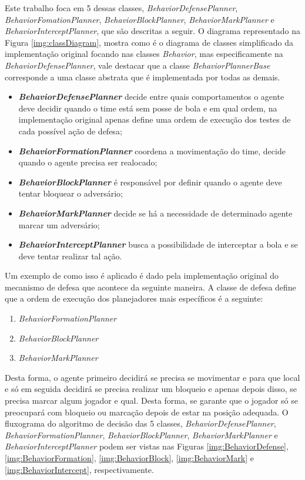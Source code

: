 Este trabalho foca em 5 dessas classes, \textit{BehaviorDefensePlanner},
\textit{BehaviorFomationPlanner}, \textit{BehaviorBlockPlanner},
\textit{BehaviorMarkPlanner} e \textit{BehaviorInterceptPlanner}, que são
descritas a seguir. O diagrama representado na Figura \ref{img:classDiagram},
mostra como é o diagrama de classes simplificado da implementação original
focando nas classes \textit{Behavior}, mas especificamente na
\textit{BehaviorDefensePlanner}, vale destacar que a classe
\textit{BehaviorPlannerBase} corresponde a uma classe abstrata que é
implementada por todas as demais.

\begin{itemize}
    \item \textbf{\textit{BehaviorDefensePlanner}} decide entre quais
    comportamentos o agente deve decidir quando o time está sem posse de bola e
    em qual ordem, na implementação original apenas define uma ordem de execução
    dos testes de cada possível ação de defesa;
    \item \textbf{\textit{BehaviorFormationPlanner}} coordena a movimentação do
    time, decide quando o agente precisa ser realocado;
    \item \textbf{\textit{BehaviorBlockPlanner}} é responsável por definir
    quando o agente deve tentar bloquear o adversário;
    \item \textbf{\textit{BehaviorMarkPlanner}} decide se há a necessidade de
    determinado agente marcar um adversário;
    \item \textbf{\textit{BehaviorInterceptPlanner}} busca a possibilidade de
    interceptar a bola e se deve tentar realizar tal ação.
\end{itemize}


Um exemplo de como isso é aplicado é dado pela implementação original do
mecanismo de defesa que acontece da seguinte maneira. A classe de defesa define
que a ordem de execução dos planejadores mais específicos é a seguinte:

\begin{enumerate}
    \item \textit{BehaviorFormationPlanner}
    \item \textit{BehaviorBlockPlanner}
    \item \textit{BehaviorMarkPlanner}
\end{enumerate}

Desta forma, o agente primeiro decidirá se precisa se movimentar e para que
local e só em seguida decidirá se precisa realizar um bloqueio e apenas depois
disso, se precisa marcar algum jogador e qual. Desta forma, se garante que o
jogador só se preocupará com bloqueio ou marcação depois de estar na posição
adequada. O fluxograma do algoritmo de decisão das 5 classes,
\textit{BehaviorDefensePlanner}, \textit{BehaviorFormationPlanner},
\textit{BehaviorBlockPlanner}, \textit{BehaviorMarkPlanner}
e \textit{BehaviorInterceptPlanner} podem ser vistas nas
Figuras \ref{img:BehaviorDefense}, \ref{img:BehaviorFormation},
\ref{img:BehaviorBlock}, \ref{img:BehaviorMark} e \ref{img:BehaviorIntercept}, respectivamente.

